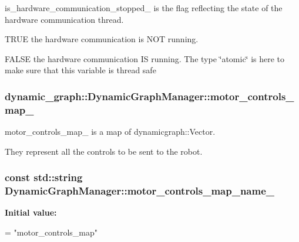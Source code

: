 is\+\_\+hardware\+\_\+communication\+\_\+stopped\+\_\+ is the flag reflecting the state of the hardware communication thread. 


\begin{DoxyItemize}
\item T\+R\+UE the hardware communication is N\+OT running.
\item F\+A\+L\+SE the hardware communication IS running. The type \char`\"{}atomic\char`\"{} is here to make sure that this variable is thread safe 
\end{DoxyItemize}
\subsubsection[{\texorpdfstring{motor\+\_\+controls\+\_\+map\+\_\+}{motor_controls_map_}}]{ dynamic\+\_\+graph\+::\+Dynamic\+Graph\+Manager\+::motor\+\_\+controls\+\_\+map\+\_\+\hspace{0.3cm}{\ttfamily [protected]}}\hypertarget{classdynamic__graph_1_1DynamicGraphManager_a03eabd2f08990a1dcc1caa652b701020}{}\label{classdynamic__graph_1_1DynamicGraphManager_a03eabd2f08990a1dcc1caa652b701020}


motor\+\_\+controls\+\_\+map\+\_\+ is a map of dynamicgraph\+::\+Vector. 

They represent all the controls to be sent to the robot. 
\subsubsection[{\texorpdfstring{motor\+\_\+controls\+\_\+map\+\_\+name\+\_\+}{motor_controls_map_name_}}]{\setlength{\rightskip}{0pt plus 5cm}const std\+::string Dynamic\+Graph\+Manager\+::motor\+\_\+controls\+\_\+map\+\_\+name\+\_\+\hspace{0.3cm}{\ttfamily [static]}}\hypertarget{classdynamic__graph_1_1DynamicGraphManager_a056de4d7a49496b2b0812d96d93370d9}{}\label{classdynamic__graph_1_1DynamicGraphManager_a056de4d7a49496b2b0812d96d93370d9}
{\bfseries Initial value\+:}
\begin{DoxyCode}
=
    \textcolor{stringliteral}{"motor\_controls\_map"}
\end{DoxyCode}


